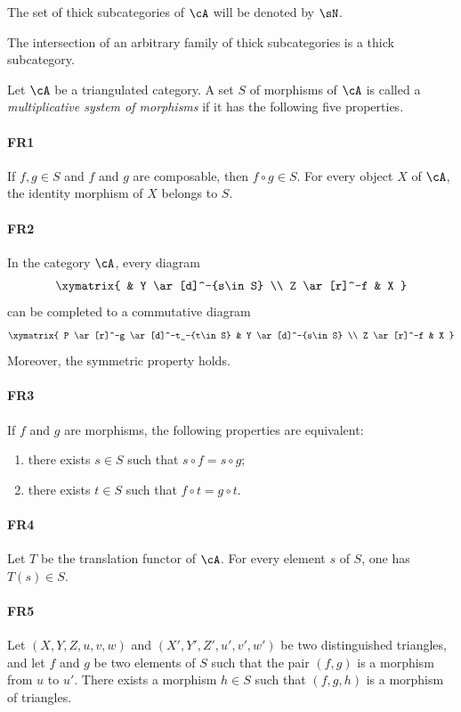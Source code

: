 The set of thick subcategories of $\cA$ will be denoted by $\sN$.

The intersection of an arbitrary family of thick subcategories is a thick
subcategory.

\begin{definition}
Let $\cA$ be a triangulated category. A set $S$ of morphisms of $\cA$ is
called a \emph{multiplicative system of morphisms} if it has the following
five properties.

\paragraph{FR1}
\hypertarget{VIII:FR1}{}
If $f,g\in S$ and $f$ and $g$ are composable, then $f\circ g\in S$. For
every object $X$ of $\cA$, the identity morphism of $X$ belongs to $S$.

\paragraph{FR2}
\hypertarget{VIII:FR2}{}
In the category $\cA$, every diagram
\[\xymatrix{
  & Y \ar[d]^-{s\in S} \\
  Z \ar[r]^-f
    & X
}\]
can be completed to a commutative diagram
\[\xymatrix{
  P \ar[r]^-g \ar[d]^-t_-{t\in S}
    & Y \ar[d]^-{s\in S} \\
  Z \ar[r]^-f
    & X
}\]
Moreover, the symmetric property holds.

\paragraph{FR3}
\hypertarget{VIII:FR3}{}
If $f$ and $g$ are morphisms, the following properties are equivalent:
\begin{enumerate}[\indent i)]
  \item there exists $s\in S$ such that $s\circ f=s\circ g$;
  \item there exists $t\in S$ such that $f\circ t=g\circ t$.
\end{enumerate}

\paragraph{FR4}
\hypertarget{VIII:FR4}{}
Let $T$ be the translation functor of $\cA$. For every element $s$ of $S$,
one has $T(s)\in S$.

\paragraph{FR5}
\hypertarget{VIII:FR5}{}
Let $(X,Y,Z,u,v,w)$ and $(X',Y',Z',u',v',w')$ be two distinguished
triangles, and let $f$ and $g$ be two elements of $S$ such that the pair
$(f,g)$ is a morphism from $u$ to $u'$. There exists a morphism $h\in S$
such that $(f,g,h)$ is a morphism of triangles.
\end{definition}

